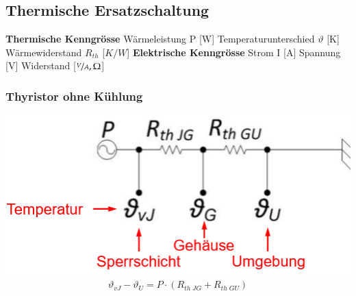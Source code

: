\subsection{Thermische Ersatzschaltung}

\begin{multicols}{3}
    \begin{minipage}{\linewidth}
        \textbf{Thermische Kenngrösse}\newline
        Wärmeleistung P [W]\newline
        Temperaturunterschied $ \vartheta $ [K]\newline
        Wärmewiderstand $ R_{th} $ [${K}/{W}$]\newline
        \textbf{Elektrische Kenngrösse}\newline
        Strom I  [A]\newline
        Spannung [V]\newline
        Widerstand [$\nicefrac{V}{A}, \Omega$]\newline
    \end{minipage}
	\begin{minipage}{\linewidth}
		\subsubsection{Thyristor ohne Kühlung}
		\includegraphics[width=\linewidth]{images/thyrOK}
		\[ \vartheta_{vJ}-\vartheta_U=P \cdot (R_{th\; JG}+R_{th\; GU}) \]		
	\end{minipage}
	\begin{minipage}{\linewidth}
		\vspace{0.2cm}

\end{minipage}
\end{multicols}
